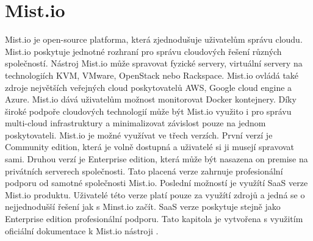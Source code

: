 \section{Mist.io}
Mist.io je open-source platforma, která zjednodušuje uživatelům správu cloudu. Mist.io poskytuje jednotné rozhraní pro správu cloudových řešení různých společností. Nástroj Mist.io může spravovat fyzické servery, virtuální servery na technologiích KVM, \linebreak VMware, OpenStack nebo Rackspace. Mist.io ovládá také zdroje největších veřejných cloud poskytovatelů AWS, Google cloud engine a Azure. Mist.io dává uživatelům možnost monitorovat Docker kontejnery. Díky široké podpoře cloudových technologií může být Mist.io využito i pro správu multi-cloud infrastruktury a minimalizovat závislost pouze na jednom poskytovateli. Mist.io je možné využívat ve třech verzích. První verzí je Community edition, která je volně dostupná a uživatelé si ji musejí spravovat sami. Druhou verzí je Enterprise edition, která může být nasazena on premise na privátních serverech společnosti. Tato placená verze zahrnuje profesionální podporu od samotné společnosti Mist.io. Poslední možností je využítí SaaS verze Mist.io produktu. Uživatelé této verze platí pouze za využítí zdrojů a jedná se o nejjednodušší řešení jak s Minst.io začít. SaaS verze poskytuje stejně jako Enterprise edition profesionální podporu. Tato kapitola je vytvořena s využitím oficiální dokumentace k Mist.io nástroji \cite{mistio}.\par
